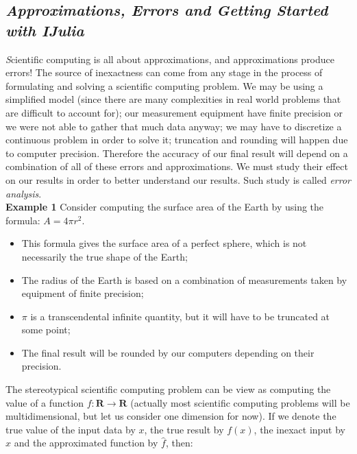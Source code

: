 \documentclass[11pt,a4paper,oneside]{report}
\begin{document}
{\center\color{magenta}
\subsection*{{\it\huge Approximations, Errors and Getting Started with IJulia}}}

{\it\huge S}cientific computing is all about approximations, and approximations produce errors! The source of inexactness can come from any stage in the process of formulating and solving a scientific computing problem. We may be using a simplified model (since there are many complexities in real world problems that are difficult to account for); our measurement equipment have finite precision or we were not able to gather that much data anyway; we may have to discretize a continuous problem in order to solve it; truncation and rounding will happen due to computer precision. Therefore the accuracy of our final result will depend on a combination of all of these errors and approximations. We must study their effect on our results in order to better understand our results. Such study is called \emph{error analysis}.\\

{\bf Example 1 } Consider computing the surface area of the Earth by using the formula: $A = 4\pi r^2$.\\
\begin{itemize}
\item This formula gives the surface area of a perfect sphere, which is not necessarily the true shape of the Earth;
\item The radius of the Earth is based on a combination of measurements taken by equipment of finite precision;
\item $\pi$ is a transcendental infinite quantity, but it will have to be truncated at some point;
\item The final result will be rounded by our computers depending on their precision.\\
\end{itemize}

The stereotypical scientific computing problem can be view as computing the value of a function $f: \mathbf{R} \rightarrow \mathbf{R}$ (actually most scientific computing problems will be multidimensional, but let us consider one dimension for now). If we denote the true value of the input data by $x$, the true result by $f(x)$, the inexact input by $\hat{x}$ and the approximated function by $\hat{f}$, then:\\
\end{document}
